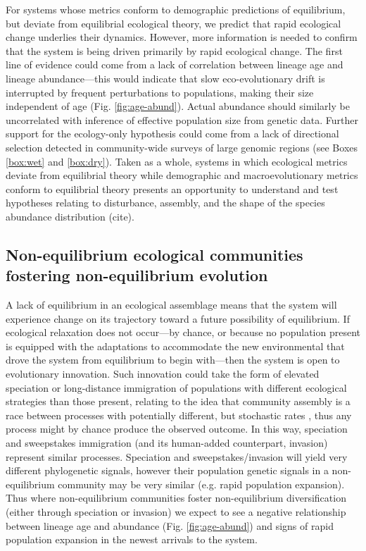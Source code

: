 \documentclass[12pt]{article}
\newcounter{Box}
\begin{document}
For systems whose metrics conform to demographic predictions of
equilibrium, but deviate from equilibrial ecological theory, we
predict that rapid ecological change underlies their
dynamics. However, more information is needed to confirm that the
system is being driven primarily by rapid ecological change. The first
line of evidence could come from a lack of correlation between lineage
age and lineage abundance---this would indicate that slow
eco-evolutionary drift is interrupted by frequent perturbations to
populations, making their size independent of age
(Fig. \ref{fig:age-abund}). Actual abundance should similarly be
uncorrelated with inference of effective population size from genetic
data. Further support for the ecology-only hypothesis could come from
a lack of directional selection detected in community-wide surveys of
large genomic regions (see Boxes \ref{box:wet} and
\ref{box:dry}). Taken as a whole, systems in which ecological metrics
deviate from equilibrial theory while demographic and
macroevolutionary metrics conform to equilibrial theory presents an
opportunity to understand and test hypotheses relating to disturbance,
assembly, and the shape of the species abundance distribution (cite).

\subsection{Non-equilibrium ecological communities fostering non-equilibrium evolution}

A lack of equilibrium in an ecological assemblage means that the
system will experience change on its trajectory toward a future
possibility of equilibrium. If ecological relaxation does not
occur---by chance, or because no population present is equipped with
the adaptations to accommodate the new environmental that drove the
system from equilibrium to begin with---then the system is open to
evolutionary innovation.  Such innovation could take the form of
elevated speciation or long-distance immigration of populations with
different ecological strategies than those present, relating to the
idea that community assembly is a race between processes with
potentially different, but stochastic rates \cite{Vanoverbeke2015-ym},
thus any process might by chance produce the observed outcome. In this
way, speciation and sweepstakes immigration (and its human-added
counterpart, invasion) represent similar processes. Speciation and
sweepstakes/invasion will yield very different phylogenetic signals,
however their population genetic signals in a non-equilibrium
community may be very similar (e.g. rapid population expansion). Thus
where non-equilibrium communities foster non-equilibrium
diversification (either through speciation or invasion) we expect to
see a negative relationship between lineage age and abundance (Fig.
\ref{fig:age-abund}) and signs of rapid population expansion in the
newest arrivals to the system.
\end{document}
